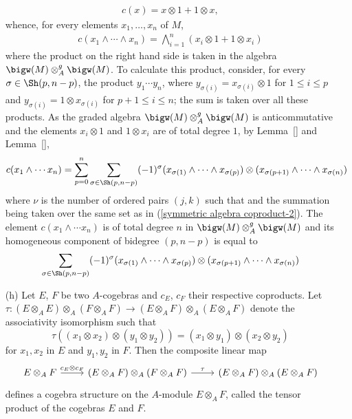\begin{example}
\begin{itemize}
\begin{align}\label{exterior algebra coproduct-1}
c(x)=x\otimes 1+1\otimes x,
\end{align}
whence, for every elements $x_1,\dots,x_n$ of $M$,
\begin{align}\label{exterior algebra coproduct-2}
c(x_1\wedge\cdots\wedge x_n)=\bigwedge_{i=1}^{n}(x_i\otimes 1+1\otimes x_i)
\end{align}
where the product on the right hand side is taken in the algebra $\bigw(M)\otimes_A^g\bigw(M)$. To calculate this product, consider, for every $\sigma\in\Sh(p,n-p)$, the product $y_1\cdots y_n$, where $y_{\sigma(i)}=x_{\sigma(i)}\otimes 1$ for $1\leq i\leq p$ and $y_{\sigma(i)}=1\otimes x_{\sigma(i)}$ for $p+1\leq i\leq n$; the sum is taken over all these products. As the graded algebra $\bigw(M)\otimes_A^g\bigw(M)$ is anticommutative and the elements $x_i\otimes 1$ and $1\otimes x_i$ are of total degree $1$, by Lemma~\ref{} and Lemma~\ref{},
\begin{align}\label{exterior algebra coproduct-3}
c(x_1\wedge\cdots x_n)=\sum_{p=0}^{n}\sum_{\sigma\in\Sh(p,n-p)}(-1)^\sigma(x_{\sigma(1)}\wedge\cdots\wedge x_{\sigma(p)})\otimes(x_{\sigma(p+1)}\wedge\cdots\wedge x_{\sigma(n)})
\end{align}
where $\nu$ is the number of ordered pairs $(j,k)$ such that  and the summation being taken over the same set as in (\ref{symmetric algebra coproduct-2}). The element $c(x_1\wedge\cdots x_n)$ is of total degree $n$ in $\bigw(M)\otimes_A^g\bigw(M)$ and its homogeneous component of bidegree $(p,n-p)$ is equal to
\begin{align}\label{exterior algebra coproduct-4}
\sum_{\sigma\in\Sh(p,n-p)}(-1)^\sigma(x_{\sigma(1)}\wedge\cdots\wedge x_{\sigma(p)})\otimes(x_{\sigma(p+1)}\wedge\cdots\wedge x_{\sigma(n)})
\end{align}
\item[(h)] Let $E$, $F$ be two $A$-cogebras and $c_E$, $c_F$ their respective coproducts. Let $\tau:(E\otimes_AE)\otimes_A(F\otimes_AF)\to (E\otimes_AF)\otimes_A(E\otimes_AF)$ denote the associativity isomorphism such that
\[\tau((x_1\otimes x_2)\otimes(y_1\otimes y_2))=(x_1\otimes y_1)\otimes(x_2\otimes y_2)\]
for $x_1,x_2$ in $E$ and $y_1,y_2$ in $F$. Then the composite linear map
\[\begin{tikzcd}
E\otimes_AF\ar[r,"c_E\otimes c_F"]&(E\otimes_AF)\otimes_A(F\otimes_AF)\ar[r,"\tau"]&(E\otimes_AF)\otimes_A(E\otimes_AF)
\end{tikzcd}\]
defines a cogebra structure on the $A$-module $E\otimes_AF$, called the tensor product of the cogebras $E$ and $F$.
\end{itemize}
\end{example}
